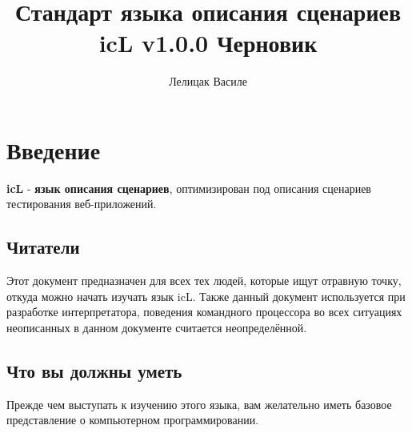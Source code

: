 \documentclass[a4paper, 14pt]{extarticle}
\begin{document}
\newcommand{\stableuni}[6]{
	\begin{longtable}[h]{#1}
	\caption*{Таблица \thetable{}: #4} \label{#3} \\

	\hline
	#2
	\hline
	\endfirsthead

	\multicolumn{3}{l}%
	{{Продолжение таблицы \thetable{}: #4}} \\
	\hline
	#2
	\hline
	\endhead

	\hline
	\endfoot

	\hline
	\endlastfoot
#5
	\end{longtable}
}


\title{Стандарт языка описания сценариев icL v1.0.0 Черновик}
\author{Лелицак Василе}

\maketitle

\newpage
\renewcommand{\contentsname}{\textsf{Оглавление}}
\tableofcontents
	
\newpage

\section{Введение}	
	
\indent \textbf{icL} - \textbf{язык описания сценариев}, оптимизирован под описания сценариев тестирования веб-приложений.
	
\subsection{Читатели}
	
Этот документ предназначен для всех тех людей, которые ищут отравную точку, откуда можно начать изучать язык icL. Также данный документ используется при разработке интерпретатора, поведения командного процессора во всех ситуациях неописанных в данном документе считается неопределённой.
	
\subsection{Что вы должны уметь}
	
Прежде чем выступать к изучению этого языка, вам желательно иметь базовое представление о компьютерном программировании.
	
\end{document}
